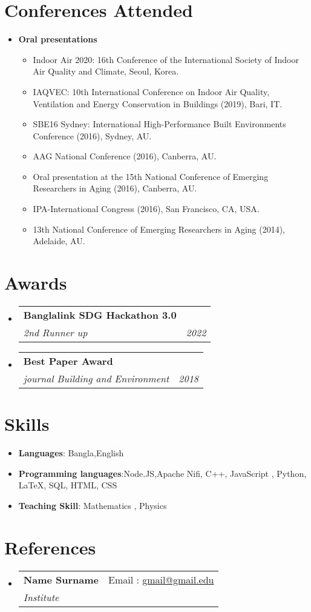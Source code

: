 \documentclass[a4paper,11pt]{article}
\makeatletter
\newcommand{\resumeItemPaper}[1]{
    \item\small{
            {#1}
    }
}
\newcommand{\resumeSubheading}[4]{
    \vspace{-1pt}\item
    \begin{tabular*}{0.97\textwidth}{l@{\extracolsep{\fill}}r}
        \textbf{#1}       & #2                 \\
        \textit{\small#3} & \textit{\small #4} \\
    \end{tabular*}\vspace{-5pt}
}
\newcommand{\resumeSubHeadingListStart}{\begin{itemize}[leftmargin=*]}
\newcommand{\resumeSubHeadingListEnd}{\end{itemize}}
\newcommand{\resumeItemListStart}{\begin{itemize}}
\newcommand{\resumeItemListEnd}{\end{itemize}\vspace{-5pt}}
\makeatother
\begin{document}
\section{Conferences Attended}
\resumeSubHeadingListStart
\item{
\textbf{Oral presentations}
\resumeItemListStart
\resumeItemPaper{Indoor Air 2020: 16th Conference of the International Society of Indoor Air Quality and Climate, Seoul, Korea.}
\resumeItemPaper{IAQVEC: 10th International Conference on Indoor Air Quality, Ventilation and Energy Conservation in Buildings (2019), Bari, IT.}
\resumeItemPaper{SBE16 Sydney: International High-Performance Built Environments Conference (2016), Sydney, AU.}
\resumeItemPaper{AAG National Conference (2016), Canberra, AU.}
\resumeItemPaper{Oral presentation at the 15th National Conference of Emerging Researchers in Aging (2016), Canberra, AU.}
\resumeItemPaper{IPA-International Congress (2016), San Francisco, CA, USA.}
\resumeItemPaper{13th National Conference of Emerging Researchers in Aging (2014), Adelaide, AU.}
\resumeItemListEnd
}
\resumeSubHeadingListEnd

\section{Awards}
\resumeSubHeadingListStart

\resumeSubheading
{Banglalink SDG Hackathon 3.0}{}
{2nd Runner up}{2022}

\resumeSubheading
{Best Paper Award}{}
{journal Building and Environment}{2018}


\resumeSubHeadingListEnd

\section{Skills}
\resumeSubHeadingListStart
\item{ \textbf{Languages}{:  Bangla,English} }
\item{ \textbf{Programming languages}{:Node.JS,Apache Nifi, C++, JavaScript , Python, \LaTeX, SQL, HTML, CSS} }
\item{ \textbf{Teaching Skill}{: Mathematics   , Physics } }
\resumeSubHeadingListEnd

\section{References}
\resumeSubHeadingListStart

\resumeSubheading
{Name Surname}{Email : \href{gmail@gmail.edu}{gmail@gmail.edu}}
{Institute}{}

\resumeSubHeadingListEnd

\end{document}
